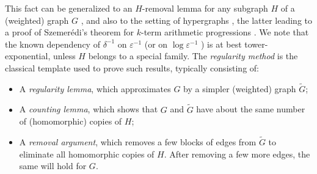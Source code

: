 \documentclass[reqno,11pt]{amsart}
\theoremstyle{definition}
\theoremstyle{remark}
\numberwithin{equation}{section}
\newcommand{\eps}{\varepsilon}
\renewcommand{\tilde}{\widetilde}
\begin{document}
This fact can be generalized to an $H$-removal lemma for any subgraph $H$ of a (weighted) graph $G$ \cite{erdos1986asymptotic,fox2011new,conlon2013graph}, and also to the setting of hypergraphs \cite{gowers2007hypergraph,tao2006variant}, the latter leading to a proof of Szemer\'edi's theorem for $k$-term arithmetic progressions \cite{szemeredi1975sets,tao2007ergodic}. %
We note that the known dependency of $\delta^{-1}$ on $\eps^{-1}$ (or on $\log \eps^{-1}$ \cite{fox2011new}) is at best tower-exponential, unless $H$ belongs to a special family. The \emph{regularity method} is the classical template used to prove such results, typically consisting of:
\begin{itemize}
    \item[1.] A \emph{regularity lemma}, which approximates $G$ by a simpler (weighted) graph $\tilde{G}$;
    \item[2.] A \emph{counting lemma}, which shows that $G$ and $\tilde{G}$ have about the same number of (homomorphic) copies of $H$;
    \item[3.] A \emph{removal argument}, which removes a few blocks of edges from $\tilde{G}$ to eliminate all homomorphic copies of $H$. After removing a few more edges, the same will hold for $G$. 
\end{itemize}
\end{document}
